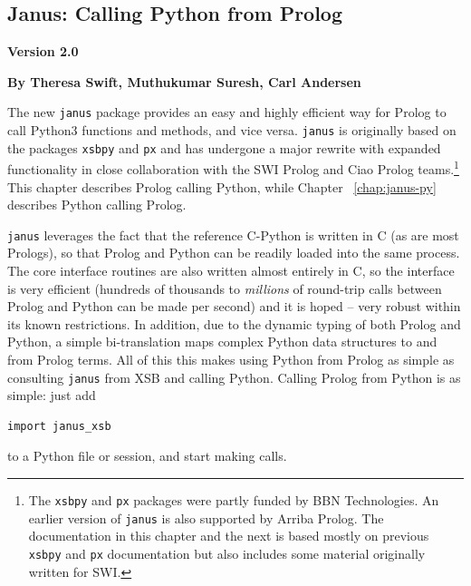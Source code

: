 \newcommand{\janus}{{\tt janus}}
\newcommand{\janusplg}{\texttt{janus-plg}}
\newcommand{\januspy}{\texttt{janus}}
\newcommand{\janusxsb}{\texttt{janus\_xsb}}
\newcommand{\jnsversion}{Version 2.0}

\begin{center}
\chapter[Janus: Prolog calling Python]{Janus: Calling Python from Prolog} \label{chap:januspy}
\end{center}

\vspace*{-.30in} 
\begin{center}
{\Large {\bf  \jnsversion}}
\end{center}

\begin{center}
  {\Large {\bf By Theresa Swift, Muthukumar Suresh, Carl Andersen}}
\end{center}

\noindent

%

The new \janus{} package provides an easy and highly efficient way for
Prolog to call Python3 functions and methods, and vice versa.
\janus{} is originally based on the packages {\tt xsbpy} and {\tt px}
\cite{SwiA23,AndS23} and has undergone a major rewrite with expanded
functionality in close collaboration with the SWI Prolog and Ciao
Prolog teams.\footnote{The {\tt xsbpy} and {\tt px} packages were
partly funded by BBN Technologies. An earlier version of \janus{} is
also supported by Arriba Prolog. The documentation in this chapter and
the next is based mostly on previous {\tt xsbpy} and {\tt px}
documentation but also includes some material originally written for
SWI.} This chapter describes Prolog calling Python, while Chapter
~\ref{chap:janus-py} describes Python calling Prolog.

\janus{} leverages the fact that the reference C-Python is written in
C (as are most Prologs), so that Prolog and Python can be readily
loaded into the same process. The core interface routines are also
written almost entirely in C, so the interface is very efficient
(hundreds of thousands to {\em millions} of round-trip calls between
Prolog and Python can be made per second) and it is hoped -- very
robust within its known restrictions.  In addition, due to the dynamic
typing of both Prolog and Python, a simple bi-translation maps complex
Python data structures to and from Prolog terms.  All of this this
makes using Python from Prolog as simple as consulting \janus{} from
XSB and calling Python.  Calling Prolog from Python is as simple: just add
\begin{verbatim}
import janus_xsb
\end{verbatim}
to a Python file or session, and start making calls.

